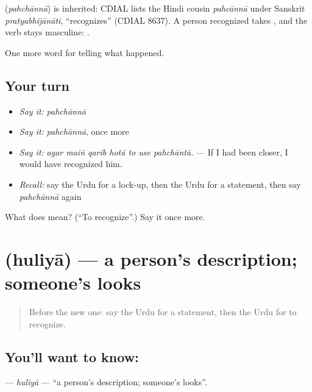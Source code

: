 \begin{cousinweb}
\textbf{} (\emph{pahchānnā}) is inherited: CDIAL lists the Hindi cousin \emph{pahcānnā} under Sanskrit \emph{pratyabhijānāti}, \textquotedblleft{}recognizes\textquotedblright{} (CDIAL 8637). A person recognized takes \textbf{}, and the verb stays masculine: \textbf{  }.
\end{cousinweb}

\begin{grammarlens}[title={What you've built}]
One more word for telling what happened.
\end{grammarlens}

\subsection*{Your turn}
\begin{itemize}
\raggedright
  \item \emph{Say it:} \emph{pahchānnā}
  \item \emph{Say it:} \emph{pahchānnā}, once more
  \item \emph{Say it:} \emph{agar maiṅ qarīb hotā to use pahchāntā.} — If I had been closer, I would have recognized him.
  \item \emph{Recall:} say the Urdu for a lock-up, then the Urdu for a statement, then say \emph{pahchānnā} again
\end{itemize}

\begin{tcolorbox}[breakable,colback=teal!4,colframe=teal!35!black,title={Before you move on}]
What does  mean? (\textquotedblleft{}To recognize\textquotedblright{}.) Say it once more.
\end{tcolorbox}
\section[\texorpdfstring{\ur{حلیہ} (huliyā)}{حلیہ (huliyā)}]{ (huliyā) — a person's description; someone's looks}

\label{lesson:UR-C279-huliya}



\begin{quote}
Before the new one: say the Urdu for a statement, then the Urdu for to recognize.
\end{quote}

\subsection*{You'll want to know: }
\textbf{} — \emph{huliyā} — \textquotedblleft{}a person's description; someone's looks\textquotedblright{}.

